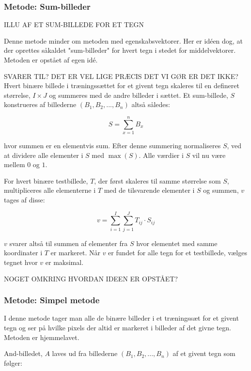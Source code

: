 \subsubsection{Metode: Sum-billeder}

ILLU AF ET SUM-BILLEDE FOR ET TEGN

Denne metode minder om metoden med egenskabsvektorer. Her er idéen dog, at der oprettes såkaldet "sum-billeder" for hvert tegn i stedet for middelvektorer. Metoden er opstået af egen idé.

SVARER TIL? DET ER VEL LIGE PRÆCIS DET VI GØR ER DET IKKE?
Hvert binære billede i træningssættet for et givent tegn skaleres til en defineret størrelse, $I \times J$ og summeres med de andre billeder i sættet. Et sum-billede, $S$ konstrueres af billederne $(B_{1},B_{2},...,B_{n})$ altså således:

\begin{displaymath}
	S = \sum_{x=1}^n{B_x}
\end{displaymath}

hvor summen er en elementvis sum. Efter denne summering normaliseres $S$, ved at dividere alle elementer i $S$ med $\max{(S)}$. Alle værdier i $S$ vil nu være mellem $0$ og $1$.

For hvert binære testbillede, $T$, der først skaleres til samme størrelse som $S$, multipliceres alle elementerne i $T$ med de tilsvarende elementer i $S$ og summen, $v$ tages af disse:

\begin{displaymath}
	v = \sum_{i=1}^I{\sum_{j=1}^J{T_{ij} \cdot S_{ij}}}
\end{displaymath}

$v$ svarer altså til summen af elementer fra $S$ hvor elementet med samme koordinater i $T$ er markeret. Når $v$ er fundet for alle tegn for et testbillede, vælges tegnet hvor $v$ er maksimal.

NOGET OMKRING HVORDAN IDEEN ER OPSTÅET?

\subsubsection{Metode: Simpel metode}

I denne metode tager man alle de binære billeder i et træningssæt for et givent tegn og ser på hvilke pixels der altid er markeret i billeder af det givne tegn. Metoden er hjemmelavet.

And-billedet, $A$ laves ud fra billederne $(B_{1},B_{2},...,B_{n})$ af et givent tegn som følger:

